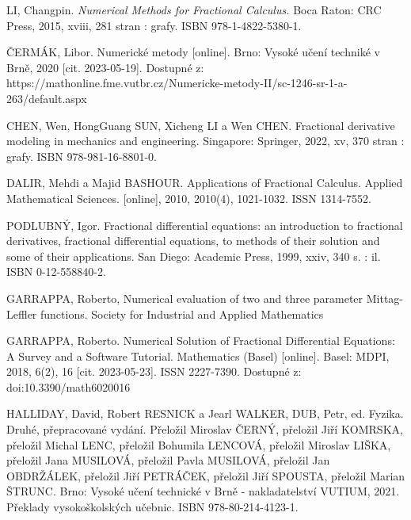 \documentclass[a4paper,12pt,twoside]{article}
\theoremstyle{definition}
\theoremstyle{remark}
\numberwithin{equation}{section}
\numberwithin{table}{section}
\numberwithin{figure}{section}
\begin{document}
\newpage
\newpage
\begin{thebibliography}{12}
 LI, Changpin. {\em Numerical Methods for Fractional Calculus.} Boca Raton: CRC Press, 2015, xviii, 281 stran : grafy. ISBN 978-1-4822-5380-1.
	
 ČERMÁK, Libor. Numerické metody [online]. Brno: Vysoké učení techniké v Brně, 2020 [cit. 2023-05-19]. Dostupné z: https://mathonline.fme.vutbr.cz/Numericke-metody-II/sc-1246-sr-1-a-263/default.aspx	
		

 CHEN, Wen, HongGuang SUN, Xicheng LI a Wen CHEN. Fractional derivative modeling in mechanics and engineering. Singapore: Springer, 2022, xv, 370 stran : grafy. ISBN 978-981-16-8801-0.

DALIR, Mehdi a Majid BASHOUR. Applications of Fractional Calculus. Applied Mathematical Sciences. [online], 2010, 2010(4), 1021-1032. ISSN 1314-7552.


PODLUBNÝ, Igor. Fractional differential equations: an introduction to fractional derivatives, fractional differential equations, to methods of their solution and some of their applications. San Diego: Academic Press, 1999, xxiv, 340 s. : il. ISBN 0-12-558840-2.

 GARRAPPA, Roberto, Numerical evaluation of two and three parameter Mittag-Leffler functions. Society for Industrial and Applied Mathematics

 GARRAPPA, Roberto. Numerical Solution of Fractional Differential Equations: A Survey and a Software Tutorial. Mathematics (Basel) [online]. Basel: MDPI, 2018, 6(2), 16 [cit. 2023-05-23]. ISSN 2227-7390. Dostupné z: doi:10.3390/math6020016

 HALLIDAY, David, Robert RESNICK a Jearl WALKER, DUB, Petr, ed. Fyzika. Druhé, přepracované vydání. Přeložil Miroslav ČERNÝ, přeložil Jiří KOMRSKA, přeložil Michal LENC, přeložil Bohumila LENCOVÁ, přeložil Miroslav LIŠKA, přeložil Jana MUSILOVÁ, přeložil Pavla MUSILOVÁ, přeložil Jan OBDRŽÁLEK, přeložil Jiří PETRÁČEK, přeložil Jiří SPOUSTA, přeložil Marian ŠTRUNC. Brno: Vysoké učení technické v Brně - nakladatelství VUTIUM, 2021. Překlady vysokoškolských učebnic. ISBN 978-80-214-4123-1.


\end{thebibliography}
\end{document}
